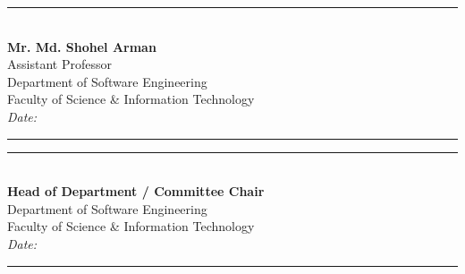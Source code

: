 \documentclass[11pt,a4paper]{article}
\begin{document}
\vspace{1.0cm}
\noindent
\begin{minipage}[t]{0.48\textwidth}
    \rule{2.8in}{0.6pt}\\[0.2cm]
    \textbf{Mr. Md. Shohel Arman}\\
    Assistant Professor\\
    Department of Software Engineering\\
    Faculty of Science \& Information Technology\\
    \textit{Date:} \rule{1.5in}{0.4pt}
\end{minipage}
\hfill
\begin{minipage}[t]{0.48\textwidth}
    \rule{2.8in}{0.6pt}\\[0.2cm]
    \textbf{Head of Department / Committee Chair}\\
    Department of Software Engineering\\
    Faculty of Science \& Information Technology\\
    \textit{Date:} \rule{1.5in}{0.4pt}
\end{minipage}
\end{document}
